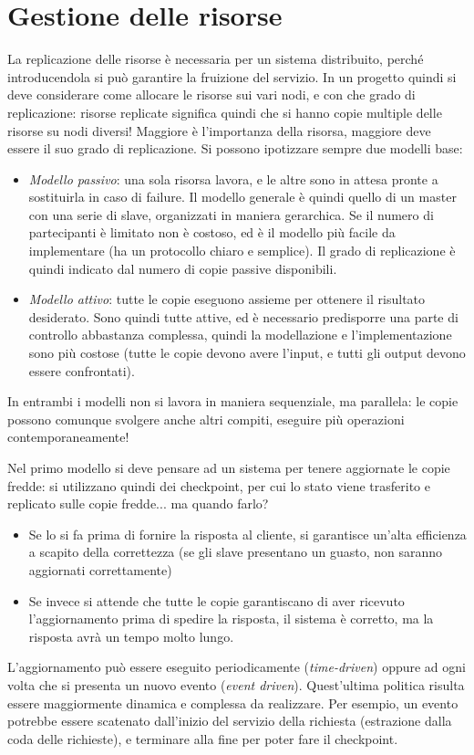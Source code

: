 \section{Gestione delle risorse}
La replicazione delle risorse è necessaria per un sistema distribuito, perché
introducendola si può garantire la
fruizione del servizio. In un progetto quindi si deve considerare come allocare
le risorse sui vari nodi, e con che
grado di replicazione: risorse replicate significa quindi che si hanno copie
multiple delle risorse su nodi diversi!
Maggiore è l'importanza della risorsa, maggiore deve essere il suo grado di
replicazione.
Si possono ipotizzare sempre due modelli base:
\begin{itemize}
 \item \textit{Modello passivo}: una sola risorsa lavora, e le altre sono in
attesa pronte a sostituirla in caso di
 failure. Il modello generale è quindi quello di un master con una serie di
slave, organizzati in maniera gerarchica.
 Se il numero di partecipanti è limitato non è costoso, ed è il modello più
facile da implementare (ha un protocollo
 chiaro e semplice). Il grado di replicazione è quindi indicato dal numero di
copie passive disponibili.
 \item \textit{Modello attivo}: tutte le copie eseguono assieme per ottenere il
risultato desiderato. Sono quindi tutte
 attive, ed è necessario predisporre una parte di controllo abbastanza
complessa, quindi la modellazione e
 l'implementazione sono più costose (tutte le copie devono avere l'input, e
tutti gli output devono essere confrontati).
\end{itemize}
In entrambi i modelli non si lavora in maniera sequenziale, ma parallela: le
copie possono comunque svolgere anche
altri compiti, eseguire più operazioni contemporaneamente!

Nel primo modello si deve pensare ad un sistema per tenere aggiornate le copie
fredde: si utilizzano quindi dei
checkpoint, per cui lo stato viene trasferito e replicato sulle copie fredde...
ma quando farlo?
\begin{itemize}
 \item Se lo si fa prima di fornire la risposta al cliente, si garantisce
un'alta efficienza a scapito della
 correttezza (se gli slave presentano un guasto, non saranno aggiornati
correttamente)
 \item Se invece si attende che tutte le copie garantiscano di aver ricevuto
l'aggiornamento prima di spedire la
 risposta, il sistema è corretto, ma la risposta avrà un tempo molto lungo.
\end{itemize}
L'aggiornamento può essere eseguito periodicamente (\textit{time-driven})
oppure ad ogni volta che si presenta un nuovo
evento (\textit{event driven}). Quest'ultima politica risulta essere
maggiormente dinamica e complessa da realizzare.
Per esempio, un evento potrebbe essere scatenato dall'inizio del servizio della
richiesta (estrazione dalla coda delle
richieste), e terminare alla fine per poter fare il checkpoint.

